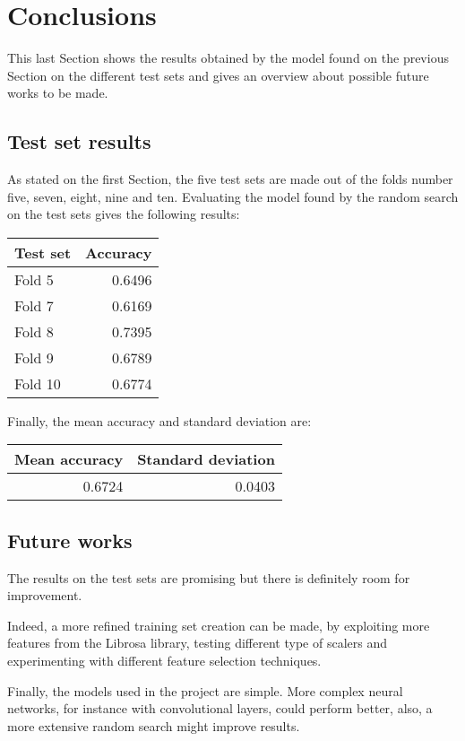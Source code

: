 \section{Conclusions}
\label{results}

This last Section shows the results obtained by the model found 
on the previous Section on the different test sets and
gives an overview about possible future works to be made.

\subsection{Test set results}
As stated on the first Section, the five test sets are made out of the 
folds number five, seven, eight, nine and ten.
Evaluating the model found by the random search on the test sets 
gives the following results: 

\begin{center}
    \begin{tabular}{ |l|r| } 
        \hline
        Test set & Accuracy\\
        \hline
        Fold 5 & 0.6496 \\
        Fold 7 & 0.6169 \\
        Fold 8 & 0.7395 \\
        Fold 9 & 0.6789 \\
        Fold 10 & 0.6774 \\ 
        \hline
    \end{tabular}
\end{center}

Finally, the mean accuracy and standard deviation are: 
\begin{center}
    \begin{tabular}{ |r|r| } 
        \hline
        Mean accuracy & Standard deviation\\
        \hline
        0.6724 & 0.0403 \\
        \hline
    \end{tabular}
\end{center}

\subsection{Future works}

The results on the test sets are promising but there is definitely 
room for improvement.

Indeed, a more refined training set creation can be made, by exploiting 
more features from the Librosa library, testing different type 
of scalers and experimenting with different feature selection 
techniques.

Finally, the models used in the project are simple. More complex 
neural networks, for instance with convolutional layers, could 
perform better, also, a more extensive random search might improve
results.